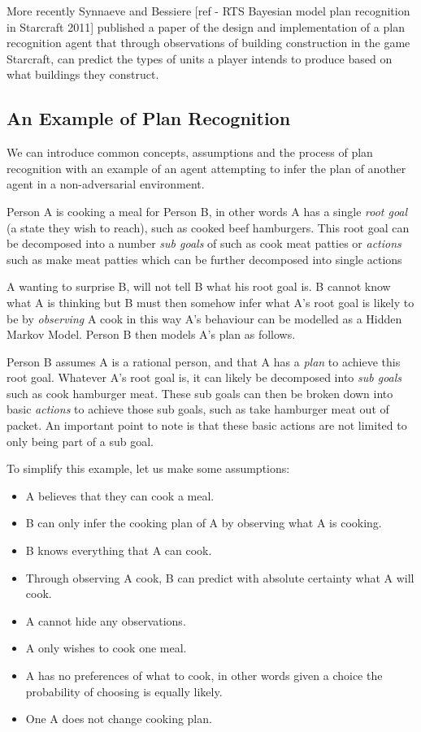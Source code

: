 \documentclass[parskip]{cs4rep}
\begin{document}
More recently Synnaeve and Bessiere [ref - RTS Bayesian model plan recognition in Starcraft 2011] published a paper of the design and implementation of a plan recognition agent that through observations of building construction in the game Starcraft, can predict the types of units a player intends to produce based on what buildings they construct.

\subsection{An Example of Plan Recognition}

We can introduce common concepts, assumptions and the process of plan recognition with an example of an agent attempting to infer the plan of another agent in a non-adversarial environment. 

Person A is cooking a meal for Person B, in other words A has a single \textit{root goal} (a state they wish to reach), such as cooked beef hamburgers. This root goal can be decomposed into a number \textit{sub goals} of such as cook meat patties or \textit{actions} such as make meat patties  which can be further decomposed into single actions

A wanting to surprise B, will not tell B what his root goal is. B cannot know what A is thinking but B must then somehow infer what A's root goal is likely to be by \textit{observing} A cook in this way A's behaviour can be modelled as a Hidden Markov Model. Person B then models A's plan as follows. 

Person B assumes A is a rational person, and that A has a \textit{plan} to achieve this root goal. Whatever A's root goal is, it can likely be decomposed into \textit{sub goals} such as cook hamburger meat. These sub goals can then be broken down into basic \textit{actions} to achieve those sub goals, such as take hamburger meat out of packet. An important point to note is that these basic actions are not limited to only being part of a sub goal.

To simplify this example, let us make some assumptions:

\begin{itemize}
\item
A believes that they can cook a meal.
\item
B can only infer the cooking plan of A by observing what A is cooking.
\item
B knows everything that A can cook.
\item
Through observing A cook, B can predict with absolute certainty what A will cook.
\item
A cannot hide any observations.
\item
A only wishes to cook one meal.
\item
A has no preferences of what to cook, in other words given a choice the probability of choosing is equally likely.
\item
One A does not change cooking plan.
\end{itemize}
\end{document}
